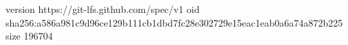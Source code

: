version https://git-lfs.github.com/spec/v1
oid sha256:a586a981c9d96ce129b111cb1dbd7fc28e302729e15eac1eab0a6a74a872b225
size 196704
